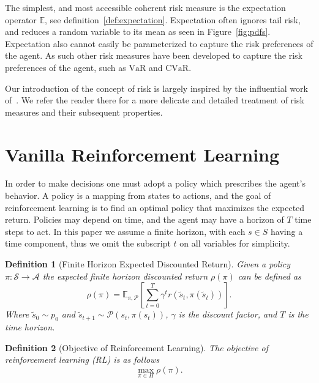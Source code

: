\documentclass[10pt]{article}
\newtheorem{definition}{Definition}
\renewcommand{\cite}{\citep}
\newcommand{\cvar}{\text{CVaR}}
\newcommand{\var}{\text{VaR}}
\theoremstyle{plain}
\theoremstyle{remark}
\begin{document}
The simplest, and most accessible coherent risk measure is the expectation operator $\mathbb{E}$, see definition~\ref{def:expectation}.\label{sec:explanation-of-why-risk-measures-are-important}
Expectation often ignores tail risk, and reduces a random variable to its mean as seen in Figure~\ref{fig:pdfs}.
Expectation also cannot easily be parameterized to capture the risk preferences of the agent.
As such other risk measures have been developed to capture the risk preferences of the agent, such as $\var$ and $\cvar$.


Our introduction of the concept of risk is largely inspired by the influential work of~\cite{follmer2016}. We refer the reader there for a more delicate and detailed treatment of risk measures and their subsequent properties.

\section{Vanilla Reinforcement Learning}\label{sec:vanilla-reinforcement-learning}

In order to make decisions one must adopt a policy which prescribes the agent's behavior.
A policy is a mapping from states to actions, and the goal of reinforcement learning is to find an optimal policy that maximizes the expected return.
Policies may depend on time, and the agent may have a horizon of $T$ time steps to act. 
In this paper we assume a finite horizon, with each $s \in S$ having a time component, thus we omit the subscript $t$ on all variables for simplicity.

\begin{definition}[Finite Horizon Expected Discounted Return]
        Given a policy $\pi : \mathcal{S} \to \mathcal{A}$ the expected finite horizon discounted return $\rho(\pi)$ can be defined as
        \[ 
          \rho(\pi) = \mathbb{E}_{\pi, \mathcal{P}} \left[ \sum_{t=0}^{T} \gamma^t r(\tilde{s}_t, \pi(\tilde{s}_t)) \right].
        \]
        Where $\tilde{s}_0 \sim p_0$ and $\tilde{s}_{t+1} \sim \mathcal{P}(s_t, \pi(s_t))$, $\gamma$ is the discount factor, and $T$ is the time horizon.
\end{definition}

\begin{definition}[Objective of Reinforcement Learning]\label{def:rl_obj}
        The objective of reinforcement learning (RL) is as follows
        \[
        \max_{\pi \in \Pi} \rho(\pi). 
        \]
\end{definition}
\end{document}
